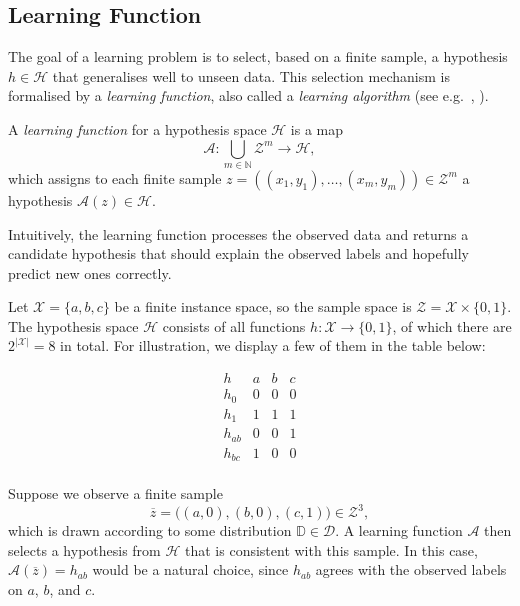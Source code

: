 \subsection{Learning Function}

The goal of a learning problem is to select, based on a finite sample, a hypothesis $h \in \mathcal{H}$ that generalises well to unseen data.
This selection mechanism is formalised by a \emph{learning function}, also called a \emph{learning algorithm} (see e.g.~\cite[Def.~2.1]{Vapnik1998}, \cite[Def.~2.2]{AnthonyBartlett2009}).

\begin{definition}
    A \emph{learning function} for a hypothesis space $\mathcal{H}$ is a map
    \[
        \mathcal{A} : \bigcup_{m \in \mathbb{N}} \mathcal{Z}^m \to \mathcal{H},
    \]
    which assigns to each finite sample $z = ((x_1,y_1),\dots,(x_m,y_m)) \in \mathcal{Z}^m$ a hypothesis $\mathcal{A}(z) \in \mathcal{H}$.
\end{definition}

\medskip

\noindent
Intuitively, the learning function processes the observed data and returns a candidate hypothesis that should explain the observed labels and hopefully predict new ones correctly.

\begin{example}
    \label{ex:learning-function}
    Let $\mathcal{X}=\{a,b,c\}$ be a finite instance space, so the sample space is $\mathcal{Z}=\mathcal{X}\times\{0,1\}$.
    The hypothesis space $\mathcal{H}$ consists of all functions $h:\mathcal{X}\to\{0,1\}$, of which there are $2^{|\mathcal{X}|}=8$ in total.
    For illustration, we display a few of them in the table below:

    \[
        \begin{array}{c|ccc}
            h & a & b & c \\
            \hline
            h_0 & 0 & 0 & 0 \\
            h_1 & 1 & 1 & 1 \\
            h_{ab} & 0 & 0 & 1 \\
            h_{bc} & 1 & 0 & 0 \\
        \end{array}
    \]

    Suppose we observe a finite sample
    \[
        \overline{z} = \bigl((a,0),(b,0),(c,1)\bigr) \in \mathcal{Z}^3,
    \]
    which is drawn according to some distribution $\mathbb{D}\in\mathcal{D}$.
    A learning function $\mathcal{A}$ then selects a hypothesis from $\mathcal{H}$ that is consistent with this sample.
    In this case, $\mathcal{A}(\overline{z})=h_{ab}$ would be a natural choice, since $h_{ab}$ agrees with the observed labels on $a$, $b$, and $c$.

\end{example}

